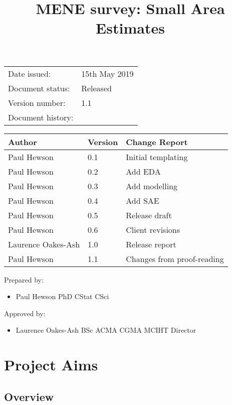 \documentclass[12pt]{tufte-book}
\title{MENE survey: Small Area Estimates}
\begin{document}
\maketitle

\newpage
\begin{tabular}{ll}
{\color{blue}Date issued:} &  {\color{blue}15th May 2019}\\
{\color{blue}Document status:} & {\color{blue}Released}\\
{\color{blue}Version number:} & {\color{blue} 1.1}\\
{\color{blue}Document history:} & \\
\end{tabular}


\begin{tabular}{|l|l|l|}
\hline
Author & Version & Change Report \\
\hline
Paul Hewson & 0.1 & Initial templating\\
\hline
Paul Hewson & 0.2 & Add EDA \\
\hline
Paul Hewson & 0.3 & Add modelling \\
\hline
Paul Hewson & 0.4 & Add SAE \\
\hline
Paul Hewson & 0.5 & Release draft\\
\hline
Paul Hewson & 0.6 & Client revisions\\
\hline
Laurence Oakes-Ash & 1.0 & Release report\\
\hline
Paul Hewson & 1.1 & Changes from proof-reading\\
\hline

\end{tabular}                    

                    
{\color{blue}Prepared by:}
\begin{itemize}
\item[] Paul Hewson PhD CStat CSci
\end{itemize}

{\color{blue}Approved by:}
\begin{itemize}
\item[] Laurence Oakes-Ash BSc ACMA CGMA MCIHT Director
\end{itemize}

\newpage

\chapter{Project Aims}


\section{Overview}
\end{document}
